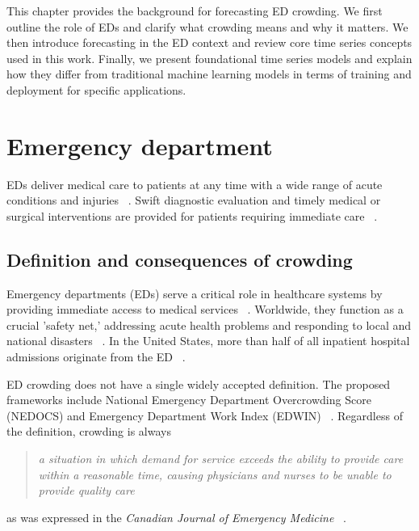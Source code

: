 This chapter provides the background for forecasting ED crowding. We first outline the role of EDs and clarify what crowding means and why it matters. We then introduce forecasting in the ED context and review core time series concepts used in this work. Finally, we present foundational time series models and explain how they differ from traditional machine learning models in terms of training and deployment for specific applications.

\section{Emergency department}

EDs deliver medical care to patients at any time with a wide range of acute conditions and injuries ~\cite{gul2018exhaustive}. Swift diagnostic evaluation and timely medical or surgical interventions are provided for patients requiring immediate care ~\cite{sartini_overcrowding_2022}.

\subsection{Definition and consequences of crowding}

Emergency departments (EDs) serve a critical role in healthcare systems by providing immediate access to medical services ~\cite{sartini_overcrowding_2022}. Worldwide, they function as a crucial 'safety net,' addressing acute health problems and responding to local and national disasters ~\cite{asplin2003conceptual,richardson_increase_2006}. In the United States, more than half of all inpatient hospital admissions originate from the ED ~\cite{asplin2003conceptual}.

ED crowding does not have a single widely accepted definition. The proposed frameworks include National Emergency Department Overcrowding Score (NEDOCS) and Emergency Department Work Index (EDWIN) ~\cite{sartini_overcrowding_2022}. Regardless of the definition, crowding is always

\begin{quote}
    \emph{a situation in which demand for service exceeds the ability to provide care within a reasonable time, causing physicians and nurses to be unable to provide quality care}
\end{quote}

as was expressed in the \emph{Canadian Journal of Emergency Medicine} ~\cite{CanadianJournalEmergencyMedicine2001}.

